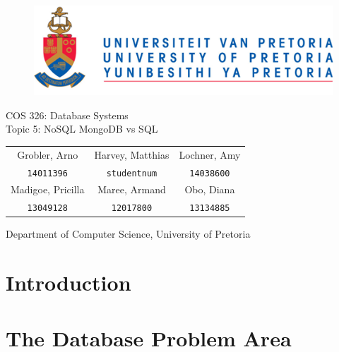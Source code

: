 \documentclass[hidelinks,english]{article}
\date{\today}
\begin{document}
	
	\begin{titlepage}
		\begin{figure}[!t]
			\includegraphics[width=\linewidth]{up_logo.png}
		\end{figure}
		\begin{center}
			\huge{COS 326: Database Systems}\\
			\huge{Topic 5: NoSQL MongoDB vs SQL}\\
			\vspace{10mm}
		\end{center}
		\begin{center}
			\begin{tabular}{ c c c }
				Grobler, Arno & Harvey, Matthias & Lochner, Amy  \\
				\texttt{14011396} & \texttt{studentnum} & \texttt{14038600} \\
				Madigoe, Pricilla & Maree, Armand & Obo, Diana \\
				\texttt{13049128} & \texttt{12017800} & \texttt{13134885} \\				
			\end{tabular}
		\end{center}
		\begin{center}
			Department of Computer Science, University of Pretoria
		\end{center}
	\end{titlepage}
	\newpage
	\tableofcontents
	\newpage
	
   \section{Introduction}
   
   
   \section{The Database Problem Area}
\end{document}
